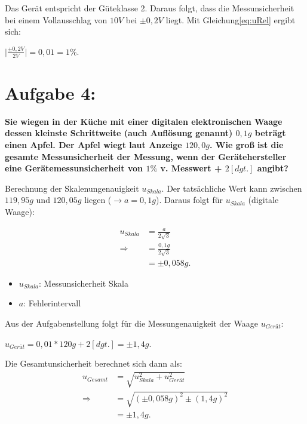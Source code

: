 \documentclass[
]{article}
\begin{document}
Das Gerät entspricht der Güteklasse 2. 
Daraus folgt, dass die Messunsicherheit bei einem Vollausschlag von \(10 V\) bei \(\pm0,2 V\) liegt. 
Mit Gleichung\ref{eq:uRel} ergibt sich:

\begin{center}
$\vert\frac{\pm 0,2V}{2V}\vert = 0,01 = 1\%$.
\end{center}

\hypertarget{aufgabe-4}{%
\section{Aufgabe 4:}\label{aufgabe-4}}

\textbf{Sie wiegen in der Küche mit einer digitalen elektronischen Waage dessen kleinste Schrittweite (auch Auflösung genannt) \(0,1 g\) beträgt einen Apfel. 
Der Apfel wiegt laut Anzeige \(120,0 g\). 
Wie groß ist die gesamte Messunsicherheit der Messung, wenn der Gerätehersteller eine Gerätemessunsicherheit von \(1\%\) v. Messwert + \(2 [dgt.]\) angibt?}

Berechnung der Skalenungenauigkeit \(u_{Skala}\). 
Der tatsächliche Wert kann zwischen \(119,95g\) und \(120,05g\) liegen (\(\rightarrow a=0,1g\)). Daraus folgt für \(u_{Skala}\) (digitale Waage):

\begin{equation}\label{eq:uDigit}
  \begin{split}
  	u_{Skala} &= \frac{a}{2\sqrt{3}}\\
    \Rightarrow &= \frac{0,1g}{2\sqrt{3}}\\
    &= \pm 0,058g.
  \end{split}
\end{equation}

\begin{itemize}
  \item $u_{Skala}$: Messunsicherheit Skala
  \item $a$: Fehlerintervall
\end{itemize}

Aus der Aufgabenstellung folgt für die Messungenauigkeit der Waage \(u_{Gerät}\):

\begin{center}
  $u_{Gerät} = 0,01 * 120g + 2 [dgt.] = \pm 1,4g.$
\end{center}

Die Gesamtunsicherheit berechnet sich dann als:
\begin{equation}\label{eq:uGes}
  \begin{split}
    u_{Gesamt} &= \sqrt{u_{Skala}^2+u_{Gerät}^2}\\
    \Rightarrow &= \sqrt{(\pm0,058g)^2\pm(1,4g)^2}\\
    &= \pm 1,4g.
  \end{split}
\end{equation}
\end{document}
